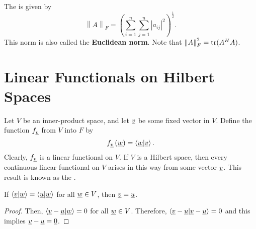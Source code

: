The  is given by
\begin{equation*}
\left\| A \right\|_F = \left( \sum_{i=1}^n \sum_{j=1}^n |a_{ij}|^2 \right)^{\frac{1}{2}} .
\end{equation*}
This norm is also called the \textbf{Euclidean norm}.
Note that $\left\| A \right\|_F^2 = \mathrm{tr} (A^H A)$.


\section{Linear Functionals on Hilbert Spaces}

Let $V$ be an inner-product space, and let $\underline{v}$ be some fixed vector in $V$.
Define the function $f_{\underline{v}}$ from $V$ into $F$ by
\begin{equation*}
f_{\underline{v}} \left( \underline{w} \right)
= \left\langle \underline{w} | \underline{v} \right\rangle .
\end{equation*}
Clearly, $f_{\underline{v}}$ is a linear functional on $V$.
If $V$ is a Hilbert space, then every continuous linear functional on $V$ arises in this way from some vector $\underline{v}$.
This result is known as the .

\begin{lemma} \label{lemma:DualSpaceSeparatesPoints}
If $\langle \underline{v} | \underline{w} \rangle = \langle \underline{u} | \underline{w} \rangle$ for all $\underline{w} \in V$, then $\underline{v} = \underline{u}$.
\end{lemma}
\begin{proof}
Then, $\langle \underline{v} - \underline{u} | \underline{w} \rangle = 0$ for all $\underline{w} \in V$.
Therefore, $\langle \underline{v} - \underline{u} | \underline{v} - \underline{u} \rangle = 0$ and this implies $\underline{v} - \underline{u} = \underline{0}$.
\end{proof}

